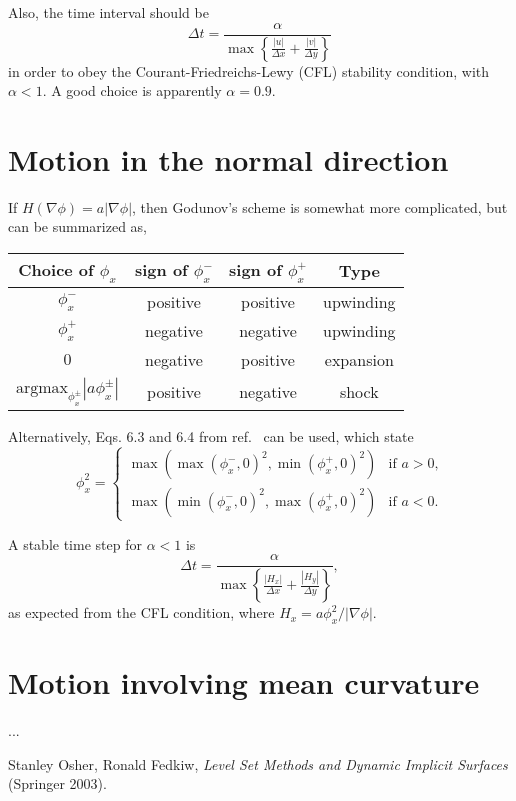 \documentclass{article}
\newcommand{\be}{\begin{equation}}
\newcommand{\ee}{\end{equation}}
\newcommand{\grad}{\nabla}
\begin{document}
Also, the time interval should be 
\be \Delta t = \frac{\alpha} 
    {\max\left\{\frac{|u|}{\Delta x} + \frac{|v|}{\Delta y} \right\}} \ee
in order to obey the Courant-Friedreichs-Lewy (CFL) stability condition, with $\alpha < 1$. A good choice is apparently $\alpha = 0.9$.

\section{Motion in the normal direction}
If $H(\grad \phi) = a |\grad \phi|$, then Godunov's scheme is somewhat more complicated, but can be summarized as,

\begin{center}
\begin{tabular}{c|c c c}
Choice of $\phi_x$ & sign of $\phi_x^-$ & sign of $\phi_x^+$ & Type \\ \hline
$\phi_x^-$ & positive & positive & upwinding \\
$\phi_x^+$ & negative & negative & upwinding \\
$0$ & negative & positive & expansion \\
$\text{argmax}_{\phi_x^\pm}|a\phi_x^\pm|$ & positive & negative & shock 
\end{tabular}
\end{center}

Alternatively, Eqs. 6.3 and 6.4 from ref.~\cite{OF} can be used, which state
\be \phi_x^2 = \begin{cases}
    \max(\max(\phi_x^-,0)^2, \min(\phi_x^+,0)^2) & \text{if $a > 0$,} \\
    \max(\min(\phi_x^-,0)^2, \max(\phi_x^+,0)^2) & \text{if $a < 0$.} 
    \end{cases} \ee

A stable time step for $\alpha < 1$ is 
\be \Delta t = \frac{\alpha}{\max\left\{\frac{|H_x|}
    {\Delta x} + \frac{|H_y|}{\Delta y}\right\}}, \ee
as expected from the CFL condition, where $H_x = a \phi_x^2 / |\grad \phi|$.

\section{Motion involving mean curvature}
...

\begin{thebibliography}{99}
 Stanley Osher, Ronald Fedkiw, \emph{Level Set Methods and Dynamic Implicit Surfaces} (Springer 2003).
\end{thebibliography}
\end{document}
